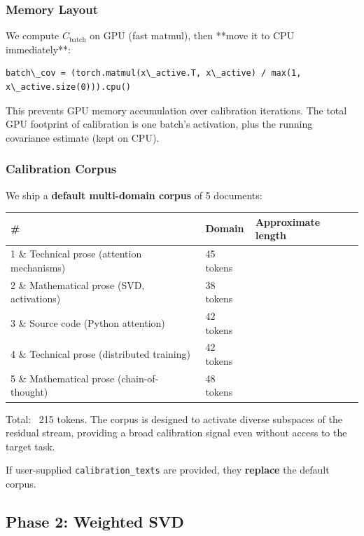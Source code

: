 \subsubsection{Memory Layout}

We compute $C_\text{batch}$ on GPU (fast matmul), then **move it to CPU 
immediately**:

\begin{lstlisting}
batch\_cov = (torch.matmul(x\_active.T, x\_active) / max(1, x\_active.size(0))).cpu()
\end{lstlisting}

This prevents GPU memory accumulation over calibration iterations. The total 
GPU footprint of calibration is one batch's activation, plus the running 
covariance estimate (kept on CPU).

\subsubsection{Calibration Corpus}

We ship a \textbf{default multi-domain corpus} of 5 documents:

\begin{table}[H]
\centering
\small
\begin{tabular}{lll}
\toprule
\textbf{\#} & \textbf{Domain} & \textbf{Approximate length} \\
\midrule
1 \& Technical prose (attention mechanisms) & 45 tokens \\
2 \& Mathematical prose (SVD, activations) & 38 tokens \\
3 \& Source code (Python attention) & 42 tokens \\
4 \& Technical prose (distributed training) & 42 tokens \\
5 \& Mathematical prose (chain-of-thought) & 48 tokens \\
\bottomrule
\end{tabular}
\end{table}

Total: ~215 tokens. The corpus is designed to activate diverse subspaces 
of the residual stream, providing a broad calibration signal even without 
access to the target task.

If user-supplied \texttt{calibration\_texts} are provided, they \textbf{replace} the 
default corpus.

\subsection{Phase 2: Weighted SVD}

